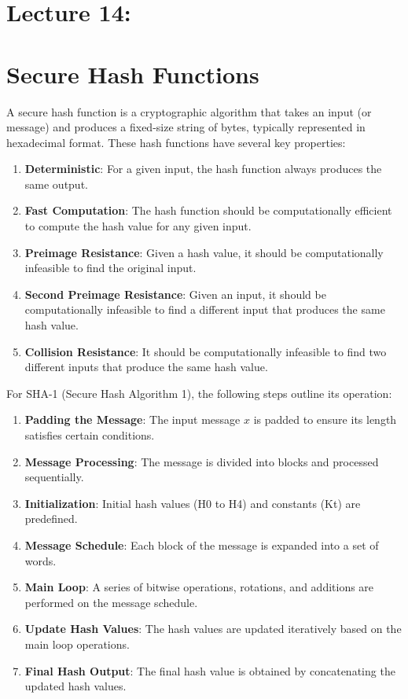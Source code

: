 \documentclass[11pt]{article}
\begin{document}
\section*{Lecture 14:}
\section*{Secure Hash Functions}

A secure hash function is a cryptographic algorithm that takes an input (or message) and produces a fixed-size string of bytes, typically represented in hexadecimal format. These hash functions have several key properties:

\begin{enumerate}
    \item \textbf{Deterministic}: For a given input, the hash function always produces the same output.
    \item \textbf{Fast Computation}: The hash function should be computationally efficient to compute the hash value for any given input.
    \item \textbf{Preimage Resistance}: Given a hash value, it should be computationally infeasible to find the original input.
    \item \textbf{Second Preimage Resistance}: Given an input, it should be computationally infeasible to find a different input that produces the same hash value.
    \item \textbf{Collision Resistance}: It should be computationally infeasible to find two different inputs that produce the same hash value.
\end{enumerate}

For SHA-1 (Secure Hash Algorithm 1), the following steps outline its operation:

\begin{enumerate}
    \item \textbf{Padding the Message}: The input message \( x \) is padded to ensure its length satisfies certain conditions.
    \item \textbf{Message Processing}: The message is divided into blocks and processed sequentially.
    \item \textbf{Initialization}: Initial hash values (H0 to H4) and constants (Kt) are predefined.
    \item \textbf{Message Schedule}: Each block of the message is expanded into a set of words.
    \item \textbf{Main Loop}: A series of bitwise operations, rotations, and additions are performed on the message schedule.
    \item \textbf{Update Hash Values}: The hash values are updated iteratively based on the main loop operations.
    \item \textbf{Final Hash Output}: The final hash value is obtained by concatenating the updated hash values.
\end{enumerate}
\end{document}
